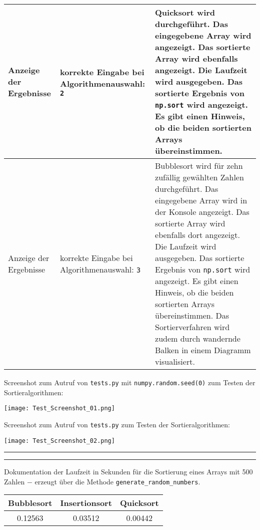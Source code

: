 \documentclass[a4paper]{article}
\begin{document}
\begin{exercise}{1}
\begin{center}
\begin{tabular}{| p{2.5cm} | p{3.2cm} | p{9cm} |}
		Anzeige der Ergebnisse & korrekte Eingabe bei Algorithmenauswahl: \newline \texttt{2}
		& Quicksort wird durchgef\"uhrt. Das eingegebene Array wird angezeigt. Das sortierte
		Array wird ebenfalls angezeigt. Die Laufzeit wird ausgegeben. Das sortierte Ergebnis von
		\texttt{np.sort} wird angezeigt. Es gibt einen Hinweis, ob die beiden sortierten Arrays
		\"ubereinstimmen. \\ \hline
		
		Anzeige der Ergebnisse & korrekte Eingabe bei Algorithmenauswahl: \newline \texttt{3}
		& Bubblesort wird f\"ur zehn zuf\"allig gew\"ahlten Zahlen durchgef\"uhrt. Das eingegebene
		Array wird in der Konsole angezeigt. Das sortierte Array wird ebenfalls dort angezeigt. Die
		Laufzeit wird ausgegeben. Das sortierte Ergebnis von \texttt{np.sort} wird angezeigt.
		Es gibt einen Hinweis, ob die beiden sortierten Arrays \"ubereinstimmen.
		Das Sortierverfahren wird zudem durch wandernde Balken in einem Diagramm
		visualisiert. \\ \hline	
		\end{tabular}
	\end{center}

\newpage

	Screenshot zum Autruf von \texttt{tests.py} mit \texttt{numpy.random.seed(0)} zum Testen
	der Sortieralgorithmen:

	\begin{center}
		\texttt{[image: Test\_Screenshot\_01.png]}
	\end{center}

\newpage
	
	Screenshot zum Autruf von \texttt{tests.py} zum Testen der Sortieralgorithmen:

	\begin{center}
		\texttt{[image: Test\_Screenshot\_02.png]}
	\end{center}

\vspace*{4ex}
\hrule
\vspace*{.5ex}
\hrule
\vspace*{2ex}

Dokumentation der Laufzeit in Sekunden f\"ur die Sortierung eines Arrays mit 500 Zahlen $-$ erzeugt \"uber
die Methode \texttt{generate\_random\_numbers}.

\begin{center}
	\begin{tabular}{| c | c | c |}
		\hline
		Bubblesort & Insertionsort & Quicksort\\ \hline \hline
		0.12563 & 0.03512 & 0.00442\\ \hline
	\end{tabular}
\end{center}



\end{exercise}
\end{document}
